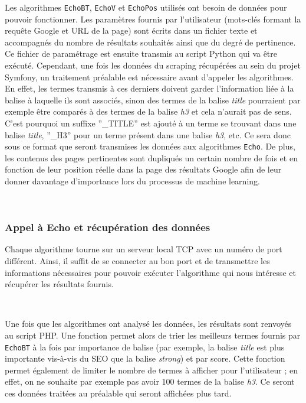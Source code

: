 \documentclass[12pt]{article}
\begin{document}
Les algorithmes \texttt{EchoBT}, \texttt{EchoV} et \texttt{EchoPos} utilisés ont besoin de données pour pouvoir fonctionner. Les paramètres fournis par l'utilisateur (mots-clés formant la requête Google et URL de la page) sont écrits dans un fichier texte et accompagnés du nombre de résultats souhaités ainsi que du degré de pertinence. Ce fichier de paramétrage est ensuite transmis au script \textsf{Python} qui va être exécuté. Cependant, une fois les données du scraping récupérées au sein du projet \textsf{Symfony}, un traitement préalable est nécessaire avant d'appeler les algorithmes. En effet, les termes transmis à ces derniers doivent garder l'information liée à la balise à laquelle ils sont associés, sinon des termes de la balise \textit{title} pourraient par exemple être comparés à des termes de la balise \textit{h3} et cela n'aurait pas de sens. C'est pourquoi un suffixe ''\_TITLE'' est ajouté à un terme se trouvant dans une balise \textit{title}, ''\_H3'' pour un terme présent dans une balise \textit{h3}, etc. Ce sera donc sous ce format que seront transmises les données aux algorithmes \texttt{Echo}. De plus, les contenus des pages pertinentes sont dupliqués un certain nombre de fois et en fonction de leur position réelle dans la page des résultats Google afin de leur donner davantage d'importance lors du processus de machine learning.

\

\subsubsection{Appel à Echo et récupération des données}

Chaque algorithme tourne sur un serveur local TCP avec un numéro de port différent. Ainsi, il suffit de se connecter au bon port et de transmettre les informations nécessaires pour pouvoir exécuter l'algorithme qui nous intéresse et récupérer les résultats fournis.

\

Une fois que les algorithmes ont analysé les données, les résultats sont renvoyés au script \textsf{PHP}. Une fonction permet alors de trier les meilleurs termes fournis par \texttt{EchoBT} à la fois par importance de balise (par exemple, la balise \textit{title} est plus importante vis-à-vis du SEO que la balise \textit{strong}) et par score. Cette fonction permet également de limiter le nombre de termes à afficher pour l'utilisateur ; en effet, on ne souhaite par exemple pas avoir 100 termes de la balise \textit{h3}. Ce seront ces données traitées au préalable qui seront affichées plus tard.
\end{document}
